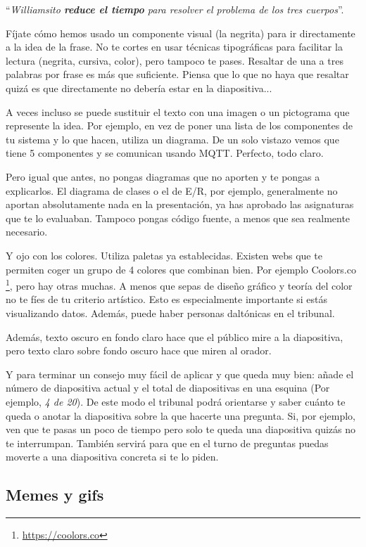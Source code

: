 ``\textit{Williamsito \textbf{reduce el tiempo} para resolver el problema de los tres cuerpos}''. 

Fíjate cómo hemos usado un componente visual (la negrita) para ir directamente a la idea de la frase. No te cortes en usar técnicas tipográficas para facilitar la lectura (negrita, cursiva, color), pero tampoco te pases. Resaltar de una a tres palabras por frase es más que suficiente. Piensa que lo que no haya que resaltar quizá es que directamente no debería estar en la diapositiva...

A veces incluso se puede sustituir el texto con una imagen o un pictograma que represente la idea. Por ejemplo, en vez de poner una lista de los componentes de tu sistema y lo que hacen, utiliza un diagrama. De un solo vistazo vemos que tiene 5 componentes y se comunican usando MQTT. Perfecto, todo claro. 

Pero igual que antes, no pongas diagramas que no aporten y te pongas a explicarlos. El diagrama de clases o el de E/R, por ejemplo, generalmente no aportan absolutamente nada en la presentación, ya has aprobado las asignaturas que te lo evaluaban. Tampoco pongas código fuente, a menos que sea realmente necesario.

Y ojo con los colores. Utiliza paletas ya establecidas. Existen webs que te permiten coger un grupo de 4 colores que combinan bien. Por ejemplo Coolors.co \footnote{\url{https://coolors.co}}, pero hay otras muchas. A menos que sepas de diseño gráfico y teoría del color no te fíes de tu criterio artístico. Esto es especialmente importante si estás visualizando datos. Además, puede haber personas daltónicas en el tribunal.

Además, texto oscuro en fondo claro hace que el público mire a la diapositiva, pero texto claro sobre fondo oscuro hace que miren al orador.

Y para terminar un consejo muy fácil de aplicar y que queda muy bien: añade el número de diapositiva actual y el total de diapositivas en una esquina (Por ejemplo, \textit{4 de 20}). De este modo el tribunal podrá orientarse y saber cuánto te queda o anotar la diapositiva sobre la que hacerte una pregunta. Si, por ejemplo, ven que te pasas un poco de tiempo pero solo te queda una diapositiva quizás no te interrumpan. También servirá para que en el turno de preguntas puedas moverte a una diapositiva concreta si te lo piden.

\subsection{Memes y gifs}

